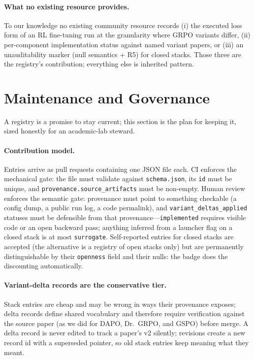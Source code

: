 \documentclass{article}
\begin{document}
\paragraph{What no existing resource provides.}
To our knowledge no existing community resource records (i) the executed loss
form of an RL fine-tuning run at the granularity where GRPO variants differ,
(ii) per-component implementation status against named variant papers, or
(iii) an unauditability marker (null semantics + R5) for closed stacks. Those
three are the registry's contribution; everything else is inherited pattern.
 \section{Maintenance and Governance}
\label{sec:p6-governance}

A registry is a promise to stay current; this section is the plan for keeping
it, sized honestly for an academic-lab steward.

\paragraph{Contribution model.}
Entries arrive as pull requests containing one JSON file each. CI enforces the
mechanical gate: the file must validate against \texttt{schema.json}, its
\texttt{id} must be unique, and \texttt{provenance.source_artifacts} must be
non-empty. Human review enforces the semantic gate: provenance must point to
something checkable (a config dump, a public run log, a code permalink), and
\texttt{variant_deltas_applied} statuses must be defensible from that
provenance---\texttt{implemented} requires visible code or an open backward
pass; anything inferred from a launcher flag on a closed stack is at most
\texttt{surrogate}. Self-reported entries for closed stacks are accepted (the
alternative is a registry of open stacks only) but are permanently
distinguishable by their \texttt{openness} field and their nulls: the badge
does the discounting automatically.

\paragraph{Variant-delta records are the conservative tier.}
Stack entries are cheap and may be wrong in ways their provenance exposes;
delta records define shared vocabulary and therefore require verification
against the source paper (as we did for DAPO, Dr.~GRPO, and GSPO) before
merge. A delta record is never edited to track a paper's v2 silently;
revisions create a new record id with a superseded pointer, so old stack
entries keep meaning what they meant.
\end{document}
